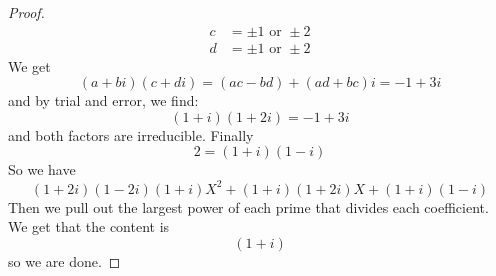 \documentclass{article}
\begin{document}
\begin{proof}
\begin{align*}
                c &= \pm 1 \text{ or } \pm 2 \\
                d &= \pm 1 \text{ or } \pm 2   
            \end{align*}
        We get 
            \begin{equation*}
                (a + bi)(c + di) = (ac - bd) + (ad + bc)i = -1 + 3i
            \end{equation*}
        and by trial and error, we find:
            \begin{equation*}
                (1 + i)(1 + 2i) = -1 + 3i
            \end{equation*}
        and both factors are irreducible. Finally
            \begin{equation*}
                2 = (1 + i)(1 - i)
            \end{equation*}
        So we have
            \begin{equation*}
                (1 + 2i)(1 - 2i)(1 + i)X^{2} + (1 + i)(1 + 2i)X + (1 + i)(1 - i)
            \end{equation*}
        Then we pull out the largest power of each prime that divides each coefficient. We get that the content is 
            \begin{equation*}
                (1 + i)
            \end{equation*}
        so we are done.
    \end{proof} 
\end{document}
